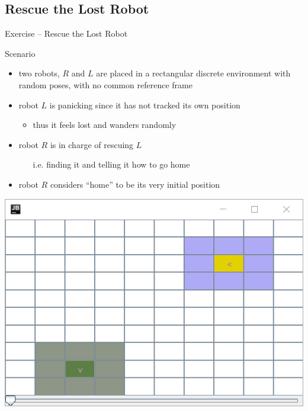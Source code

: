 \documentclass[presentation]{beamer}\mode<presentation>{\usetheme{AMSBolognaFC}}
\begin{document}
\subsection{Rescue the Lost Robot}

\begin{frame}[c, allowframebreaks]{Exercise \theJasonExample{} -- Rescue the Lost Robot}
    
    \begin{block}{Scenario}
        \begin{itemize}
            \item two robots, $R$ and $L$ are placed in a rectangular discrete environment with random poses, with no common reference frame
            
            \item robot $L$ is panicking since it has not tracked its own position
            \begin{itemize}
                \item thus it feels lost and wanders randomly
            \end{itemize}
            
            \item robot $R$ is in charge of rescuing $L$
            \begin{itemize}
                \item[i.e.] finding it and telling it how to go home
            \end{itemize}
            
            \item robot $R$ considers ``home'' to be its very initial position
            
        \end{itemize}
    \end{block}

    \begin{center}
        \includegraphics[width=.8\linewidth]{figures/robots.png}
    \end{center}


\end{frame}
\end{document}
